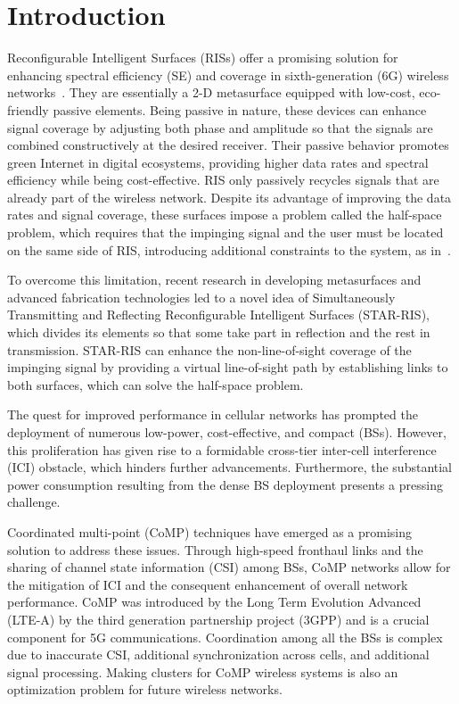 \documentclass[conference]{IEEEtran}
\begin{document}
\section{Introduction}
Reconfigurable Intelligent Surfaces (RISs) offer a promising solution for enhancing spectral efficiency (SE) and coverage in sixth-generation (6G) wireless networks~\cite{wu2019towards, di2020smart}. They are essentially a 2-D metasurface equipped with low-cost, eco-friendly passive elements. Being passive in nature, these devices can enhance signal coverage by adjusting both phase and amplitude so that the signals are combined constructively at the desired receiver. Their passive behavior promotes green Internet in digital ecosystems, providing higher data rates and spectral efficiency while being cost-effective. RIS only passively recycles signals that are already part of the wireless network. Despite its advantage of improving the data rates and signal coverage, these surfaces impose a problem called the half-space problem, which requires that the impinging signal and the user must be located on the same side of RIS, introducing additional constraints to the system, as in~\cite{hou2021joint}.

To overcome this limitation, recent research in developing metasurfaces and advanced fabrication technologies led to a novel idea of Simultaneously Transmitting and Reflecting Reconfigurable Intelligent Surfaces (STAR-RIS), which divides its elements so that some take part in reflection and the rest in transmission. STAR-RIS can enhance the non-line-of-sight coverage of the impinging signal by providing a virtual line-of-sight path by establishing links to both surfaces, which can solve the half-space problem.

The quest for improved performance in cellular networks has prompted the deployment of numerous low-power, cost-effective, and compact (BSs). However, this proliferation has given rise to a formidable cross-tier inter-cell interference (ICI) obstacle, which hinders further advancements. Furthermore, the substantial power consumption resulting from the dense BS deployment presents a pressing challenge.

Coordinated multi-point (CoMP) techniques have emerged as a promising solution to address these issues. Through high-speed fronthaul links and the sharing of channel state information (CSI) among BSs, CoMP networks allow for the mitigation of ICI and the consequent enhancement of overall network performance. CoMP was introduced by the Long Term Evolution Advanced (LTE-A) by the third generation partnership project (3GPP) and is a crucial component for 5G communications. Coordination among all the BSs is complex due to inaccurate CSI, additional synchronization across cells, and additional signal processing. Making clusters for CoMP wireless systems is also an optimization problem for future wireless networks.
\end{document}
